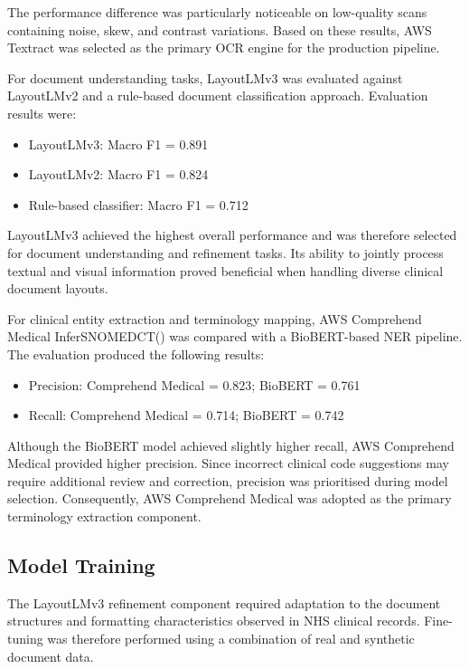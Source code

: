The performance difference was particularly noticeable on low-quality scans containing noise, skew, and contrast variations. Based on these results, AWS Textract was selected as the primary OCR engine for the production pipeline.

For document understanding tasks, LayoutLMv3 was evaluated against LayoutLMv2 and a rule-based document classification approach. Evaluation results were:

\begin{itemize}
\item LayoutLMv3: Macro F1 = 0.891
\item LayoutLMv2: Macro F1 = 0.824
\item Rule-based classifier: Macro F1 = 0.712
\end{itemize}

LayoutLMv3 achieved the highest overall performance and was therefore selected for document understanding and refinement tasks. Its ability to jointly process textual and visual information proved beneficial when handling diverse clinical document layouts.

For clinical entity extraction and terminology mapping, AWS Comprehend Medical InferSNOMEDCT() was compared with a BioBERT-based NER pipeline. The evaluation produced the following results:

\begin{itemize}
\item Precision: Comprehend Medical = 0.823; BioBERT = 0.761
\item Recall: Comprehend Medical = 0.714; BioBERT = 0.742
\end{itemize}

Although the BioBERT model achieved slightly higher recall, AWS Comprehend Medical provided higher precision. Since incorrect clinical code suggestions may require additional review and correction, precision was prioritised during model selection. Consequently, AWS Comprehend Medical was adopted as the primary terminology extraction component.

\subsection{Model Training}

The LayoutLMv3 refinement component required adaptation to the document structures and formatting characteristics observed in NHS clinical records. Fine-tuning was therefore performed using a combination of real and synthetic document data.

